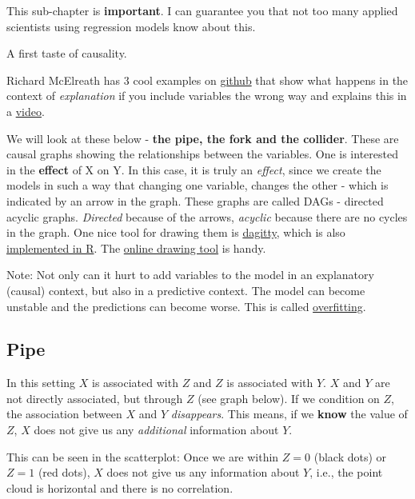 \documentclass[
]{book}
\begin{document}
This sub-chapter is \textbf{important}. I can guarantee you that not too many applied
scientists using regression models know about this.

A first taste of causality.

Richard McElreath has 3 cool examples on
\href{https://github.com/rmcelreath/causal_salad_2021/blob/main/1_causal_salad.r}{github}
that show what happens in the context of \emph{explanation} if you include variables the wrong
way and explains this in a
\href{https://www.youtube.com/watch?v=KNPYUVmY3NM&ab_channel=RichardMcElreath}{video}.

We will look at these below - \textbf{the pipe, the fork and the collider}. These are causal graphs showing the
relationships between the variables. One is interested in the \textbf{effect} of X on Y.
In this case, it is truly an \emph{effect}, since we create the models in such a way that changing
one variable, changes the other - which is indicated by an arrow in the graph.
These graphs are called DAGs - directed acyclic graphs. \emph{Directed} because of the arrows,
\emph{acyclic} because there are no cycles in the graph. One nice tool for drawing them is
\href{https://www.dagitty.net/}{dagitty}, which is also
\href{https://cran.r-project.org/web/packages/dagitty/index.html}{implemented in R}.
The \href{https://www.dagitty.net/dags.html}{online drawing tool} is handy.

Note: Not only can it hurt to add variables to the model in an explanatory (causal) context,
but also in a predictive context. The model can become unstable and the predictions
can become worse. This is called \href{https://en.wikipedia.org/wiki/Overfitting}{overfitting}.

\subsection{Pipe}\label{pipe}

In this setting \(X\) is associated with \(Z\) and \(Z\) is associated with \(Y\).
\(X\) and \(Y\) are not directly associated, but through \(Z\) (see graph below).
If we condition on \(Z\), the association between \(X\) and \(Y\) \emph{disappears}.
This means, if we \textbf{know} the value of \(Z\), \(X\) does not give us any \emph{additional} information about \(Y\).

This can be seen in the scatterplot: Once we are within \(Z=0\) (black dots) or \(Z=1\) (red dots),
\(X\) does not give us any information about \(Y\),
i.e., the point cloud is horizontal and there is no correlation.
\end{document}
